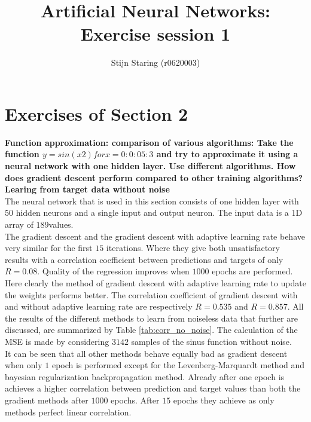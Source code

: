 \documentclass[a4paper,10pt]{article}
\title{Artificial Neural Networks: Exercise session 1}
\author{Stijn Staring (r0620003)}
\newcommand{\RemoveMe}[1]{{\color{purple}#1}}
\begin{document}
\selectfont{}

\maketitle


\section{Exercises of Section 2}
\textbf{Function approximation: comparison of various algorithms:
	Take the function $y = sin(x2) for x = 0 : 0:05 : 3$ and try to approximate it using a neural network with one hidden
	layer. Use different algorithms. How does gradient descent perform compared to other training algorithms?}\\

\textbf{Learing from target data without noise}\\
The neural network that is used in this section consists of one hidden layer with $ 50 $ hidden neurons and a single input and output neuron. The input data is a 1D array of $ 189  $values. \\

The gradient descent and the gradient descent with adaptive learning rate behave very similar for the first $ 15 $ iterations. Where they give both unsatisfactory results with a correlation coefficient between predictions and targets of only $ R = 0.08 $. Quality of the regression improves when $ 1000 $ epochs are performed. Here clearly the method of gradient descent with adaptive learning rate to update the weights performs better. The correlation coefficient of gradient descent with and without adaptive learning rate are respectively $ R = 0.535 $ and $ R = 0.857 $. All the results of the different methods to learn from noiseless data that further are discussed, are summarized by Table \ref{tab:corr_no_noise}. The calculation of the MSE is made by considering $ 3142 $ samples of the sinus function without noise. \\

It can be seen that all other methods behave equally bad as gradient descent when only $ 1 $ epoch is performed except for the Levenberg-Marquardt method and bayesian regularization backpropagation method. Already after one epoch is achieves a higher correlation between prediction and target values than both the gradient methods after $ 1000 $ epochs. After $ 15 $ epochs they achieve as only methods perfect linear correlation.\\ 
\end{document}
